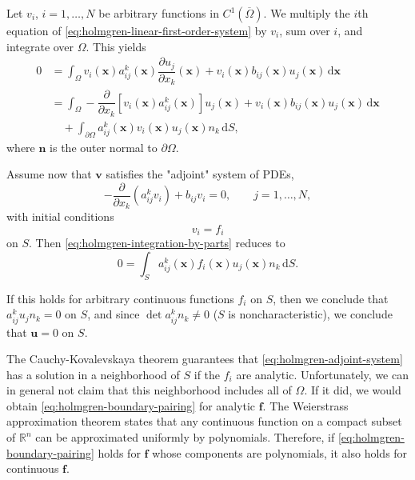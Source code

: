 Let $v_i$, $i=1,\ldots,N$ be arbitrary functions in $C^1(\overline\Omega)$. We multiply the $i$th equation of \eqref{eq:holmgren-linear-first-order-system} by $v_i$, sum over $i$, and integrate over $\Omega$. This yields
\begin{equation}\label{eq:holmgren-integration-by-parts}
\begin{aligned}
0&=\int_\Omega v_i(\bm{x})a_{ij}^k(\bm{x})\dfrac{\partial u_j}{\partial x_k}(\bm{x})+
v_i(\bm{x})b_{ij}(\bm{x})u_j(\bm{x})\,\mathrm{d}\bm{x}\\
&=\int_\Omega-\dfrac{\partial}{\partial x_k}[v_i(\bm{x})a_{ij}^k(\bm{x})]u_j(\bm{x})
+v_i(\bm{x})b_{ij}(\bm{x})u_j(\bm{x})\,\mathrm{d}\bm{x}\\
&\quad+\int_{\partial\Omega}a_{ij}^k(\bm{x})v_i(\bm{x})u_j(\bm{x})n_k\,\mathrm{d}S,
\end{aligned}
\end{equation}
where $\bm{n}$ is the outer normal to $\partial\Omega$.

Assume now that $\bm{v}$ satisfies the "adjoint" system of PDEs,
\begin{equation}\label{eq:holmgren-adjoint-system}
-\dfrac{\partial}{\partial x_k}(a_{ij}^kv_i)+b_{ij}v_i=0,\qquad j=1,\ldots,N,
\end{equation}
with initial conditions
\begin{equation}\label{eq:holmgren-adjoint-cauchy-data}
v_i=f_i
\end{equation}
on $S$. Then \eqref{eq:holmgren-integration-by-parts} reduces to
\begin{equation}\label{eq:holmgren-boundary-pairing}
0=\int_Sa_{ij}^k(\bm{x})f_i(\bm{x})u_j(\bm{x})n_k\,\mathrm{d}S.
\end{equation}


If this holds for arbitrary continuous functions $f_i$ on $S$, then we conclude that $a_{ij}^ku_jn_k=0$ on $S$, and since $\det a_{ij}^kn_k\ne0$ ($S$ is noncharacteristic), we conclude that $\bm{u}=0$ on $S$.

The Cauchy-Kovalevskaya theorem guarantees that \eqref{eq:holmgren-adjoint-system} has a solution in a neighborhood of $S$ if the $f_i$ are analytic. Unfortunately, we can in general not claim that this neighborhood includes all of $\Omega$. If it did, we would obtain \eqref{eq:holmgren-boundary-pairing} for analytic $\bm{f}$. The Weierstrass approximation theorem states that any continuous function on a compact subset of $\mathbb{R}^n$ can be approximated uniformly by polynomials. Therefore, if \eqref{eq:holmgren-boundary-pairing} holds for $\bm{f}$ whose components are polynomials, it also holds for continuous $\bm{f}$.

